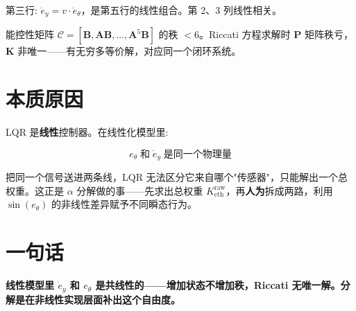 \documentclass[11pt,a4paper]{article}
\begin{document}
第三行: $\ddot{e}_y = v \cdot \ddot{e}_\theta$，是第五行的线性组合。第 2、3 列线性相关。

能控性矩阵 $\mathcal{C} = [\mathbf{B}, \mathbf{A}\mathbf{B}, \dots, \mathbf{A}^5\mathbf{B}]$ 的秩 $<6$。Riccati 方程求解时 $\mathbf{P}$ 矩阵秩亏，$\mathbf{K}$ 非唯一——有无穷多等价解，对应同一个闭环系统。

\section{本质原因}

LQR 是\textbf{线性}控制器。在线性化模型里:

\begin{equation}
e_\theta \;\text{和}\; \dot{e}_y \;\text{是同一个物理量}
\end{equation}

把同一个信号送进两条线，LQR 无法区分它来自哪个"传感器"，只能解出一个总权重。这正是 $\alpha$ 分解做的事——先求出总权重 $K_{\text{eth}}^{\text{raw}}$，再\textbf{人为}拆成两路，利用 $\sin(e_\theta)$ 的非线性差异赋予不同瞬态行为。

\begin{center}
\end{center}

\section{一句话}

\textbf{线性模型里 $\dot{e}_y$ 和 $e_\theta$ 是共线性的——增加状态不增加秩，Riccati 无唯一解。分解是在非线性实现层面补出这个自由度。}
\end{document}

